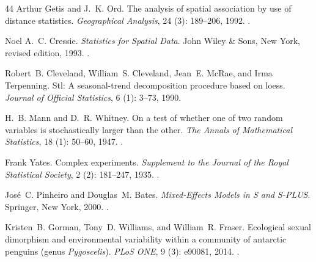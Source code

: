 \documentclass[11pt, letterpaper]{article}
\begin{document}
\begin{thebibliography}{44}
Arthur Getis and J.~K. Ord.
\newblock The analysis of spatial association by use of distance statistics.
\newblock \emph{Geographical Analysis}, 24 (3): 189--206, 1992.
\newblock {}.

Noel A.~C. Cressie.
\newblock \emph{Statistics for Spatial Data}.
\newblock John Wiley \& Sons, New York, revised edition, 1993.
\newblock {}.

Robert~B. Cleveland, William~S. Cleveland, Jean~E. McRae, and Irma Terpenning.
\newblock Stl: A seasonal-trend decomposition procedure based on loess.
\newblock \emph{Journal of Official Statistics}, 6 (1): 3--73, 1990.

H.~B. Mann and D.~R. Whitney.
\newblock On a test of whether one of two random variables is stochastically larger than the other.
\newblock \emph{The Annals of Mathematical Statistics}, 18 (1): 50--60, 1947.
\newblock {}.

Frank Yates.
\newblock Complex experiments.
\newblock \emph{Supplement to the Journal of the Royal Statistical Society}, 2 (2): 181--247, 1935.
\newblock {}.

Jos{\'e}~C. Pinheiro and Douglas~M. Bates.
\newblock \emph{Mixed-Effects Models in S and S-PLUS}.
\newblock Springer, New York, 2000.
\newblock {}.

Kristen~B. Gorman, Tony~D. Williams, and William~R. Fraser.
\newblock Ecological sexual dimorphism and environmental variability within a community of antarctic penguins (genus \emph{Pygoscelis}).
\newblock \emph{PLoS ONE}, 9 (3): e90081, 2014.
\newblock {}.

\end{thebibliography}
\end{document}
